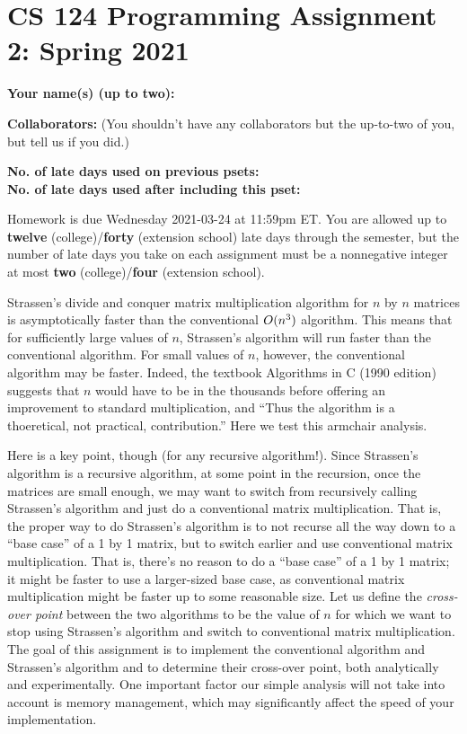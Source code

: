 \documentclass[11pt]{article}
\def\O{\mathop{\smash{O}}\nolimits}
\begin{document}
	
	\section*{CS 124 Programming Assignment 2: Spring 2021}
 		
	\textbf{Your name(s) (up to two):} 
		
	\textbf{Collaborators:} (You shouldn't have any collaborators but the up-to-two of you, but tell us if you did.)

	\textbf{No. of late days used on previous psets: }\\
	\textbf{No. of late days used after including this pset: }

Homework is due Wednesday 2021-03-24 at 11:59pm ET. You are allowed up to {\bf twelve} (college)/{\bf forty} (extension school) late days through the semester, but the number of late days you take on each assignment must be a nonnegative integer at most {\bf two} (college)/{\bf four} (extension school).


Strassen's divide and conquer matrix multiplication algorithm for $n$
by $n$ matrices is asymptotically faster than the conventional
$\O(n^3)$ algorithm.  This means that for sufficiently large values of
$n$, Strassen's algorithm will run faster than the conventional
algorithm.  For small values of $n$, however, the conventional
algorithm may be faster.  Indeed, the textbook Algorithms in C (1990
edition) suggests that $n$ would have to be in the thousands before
offering an improvement to standard multiplication, and ``Thus the
algorithm is a thoeretical, not practical, contribution.''  Here we
test this armchair analysis.

Here is a key point, though (for any recursive algorithm!).  Since
Strassen's algorithm is a recursive algorithm, at some point in the
recursion, once the matrices are small enough, we may want to switch
from recursively calling Strassen's algorithm and just do a
conventional matrix multiplication.  That is, the proper way to do
Strassen's algorithm is to not recurse all the way down to a ``base
case'' of a 1 by 1 matrix, but to switch earlier and use conventional
matrix multiplication.  That is, there's no reason to do a ``base
case'' of a 1 by 1 matrix; it might be faster to use a larger-sized
base case, as conventional matrix multiplication might be faster up to
some reasonable size.  Let us define the {\em cross-over point}
between the two algorithms to be the value of $n$ for which we want to
stop using Strassen's algorithm and switch to conventional matrix
multiplication.  The goal of this assignment is to implement the
conventional algorithm and Strassen's algorithm and to determine their
cross-over point, both analytically and experimentally.  One important
factor our simple analysis will not take into account is memory
management, which may significantly affect the speed of your
implementation.
\end{document}
